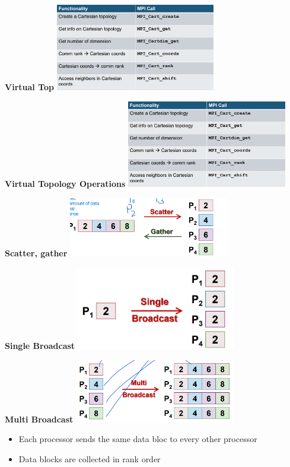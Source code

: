 \documentclass[10pt, landscape]{article}
\begin{document}
\begin{multicols}{4}
\textbf{Virtual Top}
\includegraphics*[width=7cm]{virtual_top_op.png}

\textbf{Virtual Topology Operations}
\includegraphics*[width=7cm]{virtual_top_op.png}


\textbf{Scatter, gather}
\includegraphics*[width=7cm]{scatter_gather.png}

\textbf{Single Broadcast}
\includegraphics*[width=7cm]{single_broadcast.png}

\textbf{Multi Broadcast}
\includegraphics*[width=7cm]{multi_broadcst.png}
\begin{itemize}
    \item Each processor sends the same data bloc to every other processor
    \item Data blocks are collected in rank order
\end{itemize}


\end{multicols}
\end{document}
